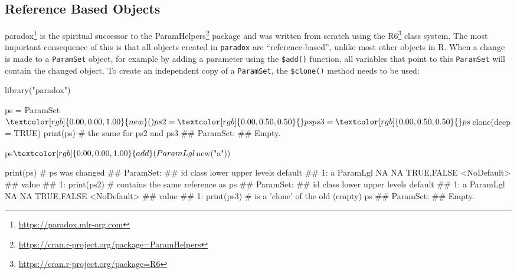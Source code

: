 \documentclass[12pt,]{scrbook}
\newenvironment{Shaded}{}{}
\newcommand{\CommentTok}[1]{\textcolor[rgb]{0.00,0.50,0.00}{#1}}
\newcommand{\DataTypeTok}[1]{#1}
\newcommand{\KeywordTok}[1]{\textcolor[rgb]{0.00,0.00,1.00}{#1}}
\newcommand{\NormalTok}[1]{#1}
\newcommand{\OperatorTok}[1]{#1}
\newcommand{\OtherTok}[1]{\textcolor[rgb]{1.00,0.25,0.00}{#1}}
\newcommand{\StringTok}[1]{\textcolor[rgb]{0.00,0.50,0.50}{#1}}
\renewcommand{\href}[2]{#2\footnote{\url{#1}}}
\begin{document}
\hypertarget{reference-based-objects}{%
\subsection{Reference Based Objects}\label{reference-based-objects}}

\href{https://paradox.mlr-org.com}{paradox} is the spiritual successor to the \href{https://cran.r-project.org/package=ParamHelpers}{ParamHelpers} package and was written from scratch using the \href{https://cran.r-project.org/package=R6}{R6} class system.
The most important consequence of this is that all objects created in \texttt{paradox} are ``reference-based'', unlike most other objects in R.
When a change is made to a \texttt{ParamSet} object, for example by adding a parameter using the \texttt{\$add()} function, all variables that point to this \texttt{ParamSet} will contain the changed object.
To create an independent copy of a \texttt{ParamSet}, the \texttt{\$clone()} method needs to be used:

\begin{Shaded}
\begin{Highlighting}[]
\KeywordTok{library}\NormalTok{(}\StringTok{"paradox"}\NormalTok{)}

\NormalTok{ps =}\StringTok{ }\NormalTok{ParamSet}\OperatorTok{$}\KeywordTok{new}\NormalTok{()}
\NormalTok{ps2 =}\StringTok{ }\NormalTok{ps}
\NormalTok{ps3 =}\StringTok{ }\NormalTok{ps}\OperatorTok{$}\KeywordTok{clone}\NormalTok{(}\DataTypeTok{deep =} \OtherTok{TRUE}\NormalTok{)}
\KeywordTok{print}\NormalTok{(ps)  }\CommentTok{# the same for ps2 and ps3}
\NormalTok{## ParamSet: }
\NormalTok{## Empty.}
\end{Highlighting}
\end{Shaded}

\begin{Shaded}
\begin{Highlighting}[]
\NormalTok{ps}\OperatorTok{$}\KeywordTok{add}\NormalTok{(ParamLgl}\OperatorTok{$}\KeywordTok{new}\NormalTok{(}\StringTok{"a"}\NormalTok{))}
\end{Highlighting}
\end{Shaded}

\begin{Shaded}
\begin{Highlighting}[]
\KeywordTok{print}\NormalTok{(ps)  }\CommentTok{# ps was changed}
\NormalTok{## ParamSet: }
\NormalTok{##    id    class lower upper      levels     default}
\NormalTok{## 1:  a ParamLgl    NA    NA  TRUE,FALSE <NoDefault>}
\NormalTok{##    value}
\NormalTok{## 1:}
\KeywordTok{print}\NormalTok{(ps2)  }\CommentTok{# contains the same reference as ps}
\NormalTok{## ParamSet: }
\NormalTok{##    id    class lower upper      levels     default}
\NormalTok{## 1:  a ParamLgl    NA    NA  TRUE,FALSE <NoDefault>}
\NormalTok{##    value}
\NormalTok{## 1:}
\KeywordTok{print}\NormalTok{(ps3)  }\CommentTok{# is a 'clone' of the old (empty) ps}
\NormalTok{## ParamSet: }
\NormalTok{## Empty.}
\end{Highlighting}
\end{Shaded}
\end{document}
